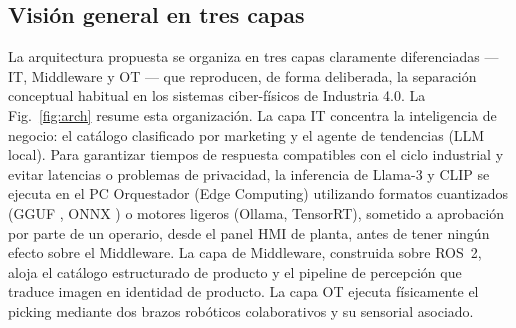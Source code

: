 \documentclass[conference]{IEEEtran}
\begin{document}
\subsection{Visión general en tres capas}

La arquitectura propuesta se organiza en tres capas claramente diferenciadas
--- IT, Middleware y OT --- que reproducen, de forma deliberada, la
separación conceptual habitual en los sistemas ciber-físicos de Industria
4.0. La Fig.~\ref{fig:arch} resume esta organización. La capa IT concentra
la inteligencia de negocio: el catálogo clasificado por marketing y el
agente de tendencias (LLM local). Para garantizar tiempos de respuesta compatibles con el ciclo industrial y evitar latencias o problemas de privacidad, la inferencia de Llama-3 \cite{llama3} y CLIP \cite{radford2021clip} se ejecuta en el PC Orquestador (Edge Computing) utilizando formatos cuantizados (GGUF \cite{ggerganov2023llamacpp}, ONNX \cite{onnxruntime}) o motores ligeros (Ollama, TensorRT),
sometido a aprobación por parte de un operario, desde el panel HMI de
planta, antes de tener ningún efecto sobre el Middleware. La capa de
Middleware, construida sobre ROS~2, aloja el
catálogo estructurado de producto y el pipeline de percepción que traduce
imagen en identidad de producto. La capa OT ejecuta físicamente el picking
mediante dos brazos robóticos colaborativos y su sensorial asociado.
\end{document}
